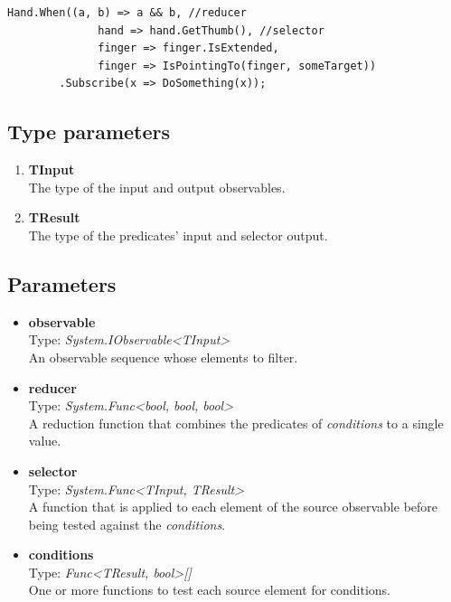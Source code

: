 \documentclass[12pt,a4paper,twoside]{report}
\begin{document}
\begin{lstlisting}[caption=Usage example]
    Hand.When((a, b) => a && b, //reducer
              hand => hand.GetThumb(), //selector
              finger => finger.IsExtended,
              finger => IsPointingTo(finger, someTarget))
        .Subscribe(x => DoSomething(x));
\end{lstlisting}

\subsection{Type parameters}
\begin{enumerate}
    \item \textbf{TInput} \\
        The type of the input and output observables.
    \item \textbf{TResult} \\
        The type of the predicates' input and selector output. 
\end{enumerate}

\subsection{Parameters}
\begin{itemize}
    \item \textbf{observable}\\
        Type: \textit{System.IObservable<TInput>}\\
        An observable sequence whose elements to filter.
    \item \textbf{reducer} \\
        Type: \textit{System.Func<bool, bool, bool>} \\
        A reduction function that combines the predicates of \textit{conditions} to a single value.
    \item \textbf{selector} \\
        Type: \textit{System.Func<TInput, TResult>}\\
        A function that is applied to each element of the source observable before being tested against the \textit{conditions}.
    \item \textbf{conditions} \\
        Type: \textit{Func<TResult, bool>[]} \\
        One or more functions to test each source element for conditions.
\end{itemize}
\end{document}
